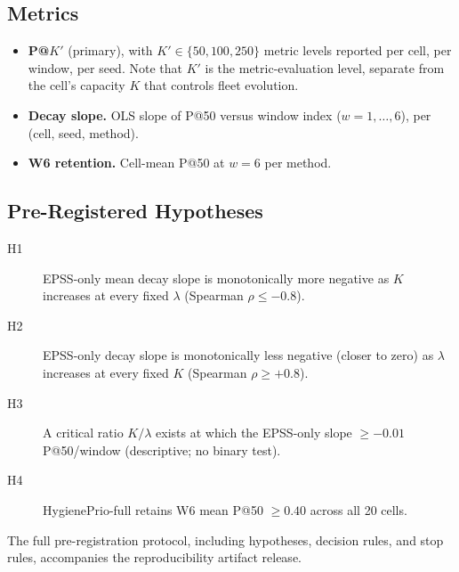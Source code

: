 \subsection{Metrics}

\begin{itemize}
\item \textbf{P@$K'$} (primary), with $K' \in \{50, 100, 250\}$
metric levels reported per cell, per window, per seed. Note that $K'$
is the metric-evaluation level, separate from the cell's capacity $K$
that controls fleet evolution.
\item \textbf{Decay slope.} OLS slope of P@50 versus window index
($w = 1, \ldots, 6$), per (cell, seed, method).
\item \textbf{W6 retention.} Cell-mean P@50 at $w = 6$ per method.
\end{itemize}

\subsection{Pre-Registered Hypotheses}

\begin{description}
\item[H1] EPSS-only mean decay slope is monotonically more negative as
$K$ increases at every fixed $\lambda$ (Spearman $\rho \leq -0.8$).
\item[H2] EPSS-only decay slope is monotonically less negative (closer
to zero) as $\lambda$ increases at every fixed $K$ (Spearman $\rho \geq +0.8$).
\item[H3] A critical ratio $K/\lambda$ exists at which the EPSS-only
slope $\geq -0.01$ P@50/window (descriptive; no binary test).
\item[H4] HygienePrio-full retains W6 mean P@50 $\geq 0.40$ across all
20 cells.
\end{description}

The full pre-registration protocol, including hypotheses, decision
rules, and stop rules, accompanies the reproducibility artifact release.
